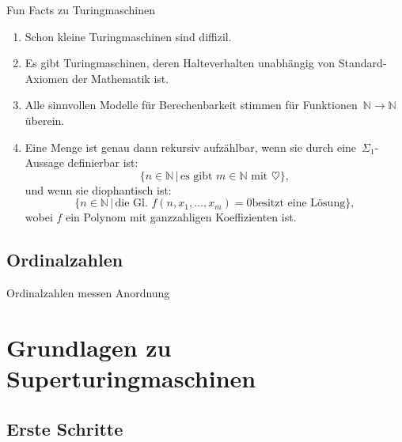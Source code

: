 \documentclass[12pt,compress,ngerman,utf8,t]{beamer}
\newcommand{\NN}{\mathbb{N}}
\begin{document}
\begin{frame}{Fun Facts zu Turingmaschinen}
  \begin{enumerate}
    \item Schon kleine Turingmaschinen sind diffizil.
    \item Es gibt Turingmaschinen, deren Halteverhalten unabhängig von
    Standard-Axiomen der Mathematik ist.
    \pause

    \item Alle sinnvollen Modelle für Berechenbarkeit stimmen für
    Funktionen~$\NN \to \NN$ überein.
    \pause

    \item Eine Menge ist genau dann rekursiv aufzählbar, wenn
    sie durch eine~$\Sigma_1$-Aussage definierbar ist:
    \[ \{ n \in \NN \,|\, \text{es gibt $m \in \NN$ mit $\heartsuit$} \}, \]
    \pause
    und wenn sie diophantisch ist:
    \[ \{ n \in \NN \,|\, \text{die Gl. $f(n,x_1,\ldots,x_m) = 0$
    besitzt eine Lösung} \}, \]
    wobei $f$ ein Polynom mit ganzzahligen Koeffizienten ist.
  \end{enumerate}
\end{frame}


\subsection{Ordinalzahlen}

\begin{frame}{Ordinalzahlen messen Anordnung}
\end{frame}


\section{Grundlagen zu Superturingmaschinen}

\subsection{Erste Schritte}
\end{document}
